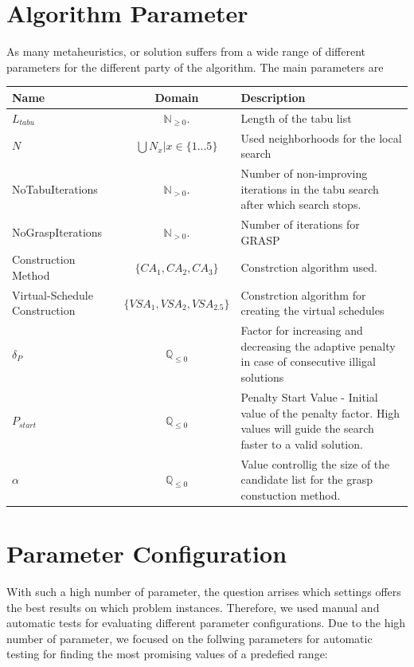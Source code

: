 \documentclass[a4paper,11pt]{article}
\begin{document}
\section{Algorithm Parameter}
As many metaheuristics, or solution suffers from a wide range of different parameters for the different party of the algorithm.
The main parameters are
\begin{center}
\begin{tabularx}{\linewidth}{| X | c | X | }
  \hline                       
  Name & Domain & Description \\   \hline     \hline    
  $L_{tabu}$ & $\mathbb{N}_{\geq0}.$ & Length of the tabu list \\ \hline    
  $N$ & $\bigcup N_x  | x \in \{1...5\}$ & Used neighborhoods for the local search \\ \hline   
  NoTabuIterations &  $\mathbb{N}_{ > 0}.$ & Number of non-improving iterations in the tabu search after which search stops. \\ \hline  
  NoGraspIterations &  $\mathbb{N}_{> 0}.$ & Number of iterations for \ac{GRASP} \\ \hline 
  Construction Method &  $\{CA_1, CA_2, CA_3\}$ & Constrction algorithm used.\\ \hline 
  Virtual-Schedule Construction &  $\{VSA_1, VSA_2, VSA_{2.5}\}$ & Constrction algorithm for creating the virtual schedules\\ \hline 
  $ \delta_P $ &  $\mathbb{Q}_{\leq0}$ & Factor for increasing and decreasing the adaptive penalty in case of consecutive illigal solutions\\ \hline 
  $P_{start}$ &  $\mathbb{Q}_{\leq0}$ &Penalty Start Value -  Initial value of the penalty factor. High values will guide the search faster to a valid solution.\\ \hline    
  $\alpha$ & $\mathbb{Q}_{\leq0}$ & Value controllig the size of the candidate list for the grasp constuction method. \\ \hline    
  \hline  
\end{tabularx}
\end{center}

\section{Parameter Configuration}
With such a high number of parameter, the question arrises which settings offers the best results on which problem instances. Therefore, we used manual and 
automatic tests for evaluating different parameter configurations.
Due to the high number of parameter, we focused on the follwing parameters for automatic testing for finding the most promising values of a predefied range:
\end{document}

